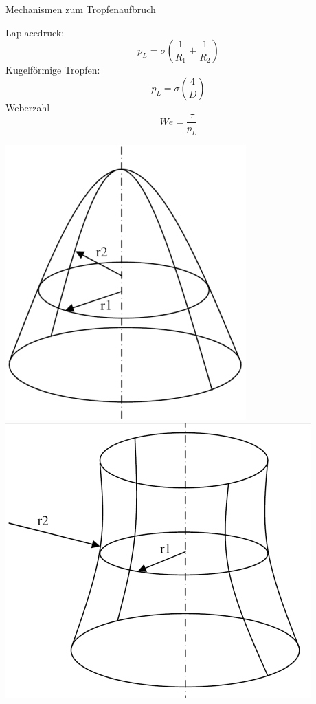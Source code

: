 \documentclass{beamer} %
\begin{document}
\begin{frame}{Mechanismen zum Tropfenaufbruch}
	\begin{minipage}{0.6\linewidth}
		Laplacedruck:
		\begin{equation*}
		p_L = \sigma \left(\frac{1}{R_1} + \frac{1}{R_2}\right)
		\end{equation*}
		Kugelförmige Tropfen:
		\begin{equation*}
		p_L = \sigma \left(\frac{4}{D}\right)
		\end{equation*}
		Weberzahl
		\begin{equation*}
		We = \frac{\tau}{p_L}
		\end{equation*}
	\end{minipage}%
	\begin{minipage}{0.4\linewidth}
		\flushright
		\includegraphics[width=0.8\linewidth]{Markus/Synklastisch}\\
		\includegraphics[width=\linewidth]{Markus/Antiklastisch}
	\end{minipage}
\end{frame}
\end{document}
